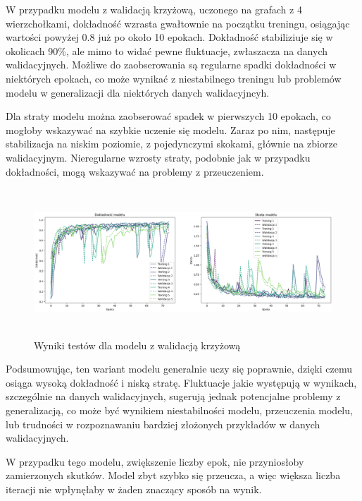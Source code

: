 W przypadku modelu z walidacją krzyżową, uczonego na grafach z 4 wierzchołkami,
dokładność wzrasta gwałtownie na początku treningu,
osiągając wartości powyżej 0.8 już po około 10 epokach.
Dokładność stabiliziuje się w okolicach 90\%, ale mimo to widać pewne fluktuacje, zwłaszacza na danych walidacyjnych.
Możliwe do zaobserowania są regularne spadki dokładności w niektórych epokach,
co może wynikać z niestabilnego treningu lub problemów modelu w generalizacji dla niektórych danych walidacyjncyh.

Dla straty modelu można zaobserować spadek w pierwszych 10 epokach, co mogłoby wskazywać na szybkie uczenie się modelu.
Zaraz po nim, następuje stabilizacja na niskim poziomie, z pojedynczymi skokami, głównie na zbiorze walidacyjnym.
Nieregularne wzrosty straty, podobnie jak w przypadku dokładności, mogą wskazywać na problemy z przeuczeniem.

\begin{figure}[ht]
	\centering
	\includegraphics[height=5.5cm]{resources/tests/images/v3/crossvalid_img.png}
	\caption{Wyniki testów dla modelu z walidacją krzyżową}
	\label{Fig:tests-cv-0a}
\end{figure}
\FloatBarrier

Podsumowując, ten wariant modelu generalnie uczy się poprawnie, dzięki czemu osiąga wysoką dokładność i niską stratę.
Fluktuacje jakie występują w wynikach, szczególnie na danych walidacyjnych,
sugerują jednak potencjalne problemy z generalizacją, co może być wynikiem niestabilności modelu,
przeuczenia modelu, lub trudności w rozpoznawaniu bardziej złożonych przykładów w danych walidacyjnych.

W przypadku tego modelu, zwiększenie liczby epok, nie przyniosłoby zamierzonych skutków.
Model zbyt szybko się przeucza, a więc większa liczba iteracji nie wpłynęłaby w żaden znaczący sposób na wynik.

